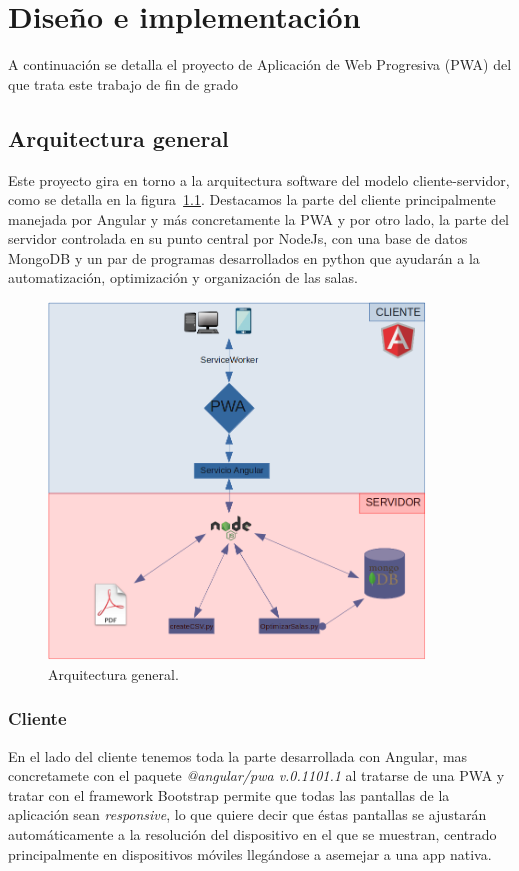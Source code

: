\documentclass[a4paper, 12pt]{book}
\begin{document}
\cleardoublepage
\chapter{Diseño e implementación}

A continuación se detalla el proyecto de Aplicación de Web Progresiva (PWA) del que trata este trabajo de fin de grado

\section{Arquitectura general} 
\label{sec:arquitectura}

Este proyecto gira en torno a la arquitectura software del modelo cliente-servidor, como se detalla en la figura~\ref{fig:arquitectura}. Destacamos la parte del cliente principalmente manejada por Angular y más concretamente la PWA y por otro lado, la parte del servidor controlada en su punto central por NodeJs, con una base de datos MongoDB y un par de programas desarrollados en python que ayudarán a la automatización, optimización y organización de las salas.
\begin{figure}[H]
  \centering
  \includegraphics[width=10cm, keepaspectratio]{img/arquitectura.png}
  \caption{Arquitectura general.}\label{fig:arquitectura}
\end{figure}

 
\subsection{Cliente}
	En el lado del cliente tenemos toda la parte desarrollada con Angular, mas concretamete con el paquete \textit{@angular/pwa v.0.1101.1} al tratarse de una PWA y tratar con el framework Bootstrap permite que todas las pantallas de la aplicación sean \textit{responsive}, lo que quiere decir que éstas pantallas se ajustarán automáticamente a la resolución del dispositivo en el que se muestran, centrado principalmente en dispositivos móviles llegándose a asemejar a una app nativa.
	
\end{document}
